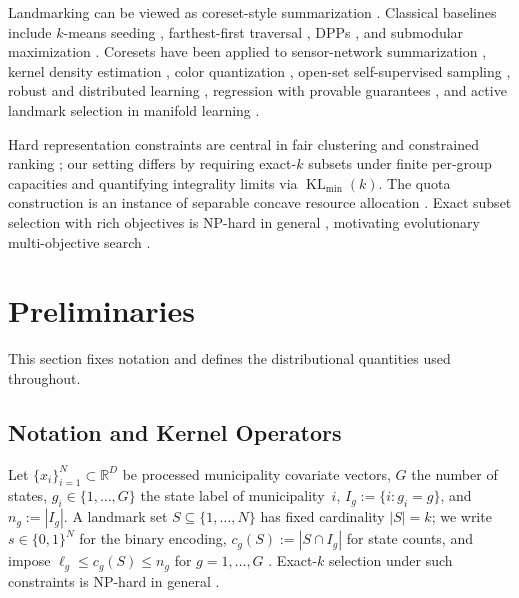 \documentclass[10pt,journal]{IEEEtran}
\newcommand{\R}{\mathbb{R}}
\newcommand{\1}{\mathbf{1}}
\DeclareMathOperator{\KL}{KL}
\theoremstyle{ieeethm}
\begin{document}
Landmarking can be viewed as coreset-style summarization \cite{phillips2016coresets,feldman2020coresets}. Classical baselines include $k$-means seeding \cite{arthur2007kmeanspp,lloyd1982least}, farthest-first traversal \cite{gonzalez1985clustering,harpeled2011geometric}, DPPs \cite{kulesza2012dpp}, and submodular maximization \cite{krause2014submodular}. Coresets have been applied to sensor-network summarization \cite{feldman2012coresetcompression}, kernel density estimation \cite{zheng2021kdecoresets}, color quantization \cite{valenzuela2018colorquantization}, open-set self-supervised sampling \cite{kim2023opensetcoresetssl}, robust and distributed learning \cite{lu2020robustcoreset,guo2024fedcore}, regression with provable guarantees \cite{boutsidis2013nearoptimalcoresets,braverman2022uniformsampling}, and active landmark selection in manifold learning \cite{chi2014activelandmark}.

Hard representation constraints are central in fair clustering and constrained ranking \cite{chierichetti2017fair,bera2019fair,celis2018fair}; our setting differs by requiring exact-$k$ subsets under finite per-group capacities and quantifying integrality limits via $\KL_{\min}(k)$. The quota construction is an instance of separable concave resource allocation \cite{ibaraki1988resource,murota2003dca,federgruen1986greedy}. Exact subset selection with rich objectives is NP-hard in general \cite{garey1979np,pardalos1991qp}, motivating evolutionary multi-objective search \cite{deb2001moea,deb2002nsga2,coello2007moea}.










\section{Preliminaries}
\label{sec:preliminaries}

This section fixes notation and defines the distributional quantities used throughout.

\subsection{Notation and Kernel Operators}
\label{subsec:measures}

Let $\{x_i\}_{i=1}^N \subset \R^D$ be processed municipality covariate vectors, $G$ the number of states,
$g_i\in\{1,\dots,G\}$ the state label of municipality~$i$, $I_g := \{ i : g_i=g\}$, and $n_g := |I_g|$.
A landmark set $S\subseteq\{1,\dots,N\}$ has fixed cardinality $|S|=k$; we write $s\in\{0,1\}^N$ for the
binary encoding, $c_g(S) := |S\cap I_g|$ for state counts, and impose
$\ell_g \le c_g(S)\le n_g$ for $g=1,\dots,G$ \cite{chierichetti2017fair,bera2019fair,celis2018fair}.
Exact-$k$ selection under such constraints is NP-hard in general
\cite{garey1979np,pardalos1991qp}.
\end{document}
